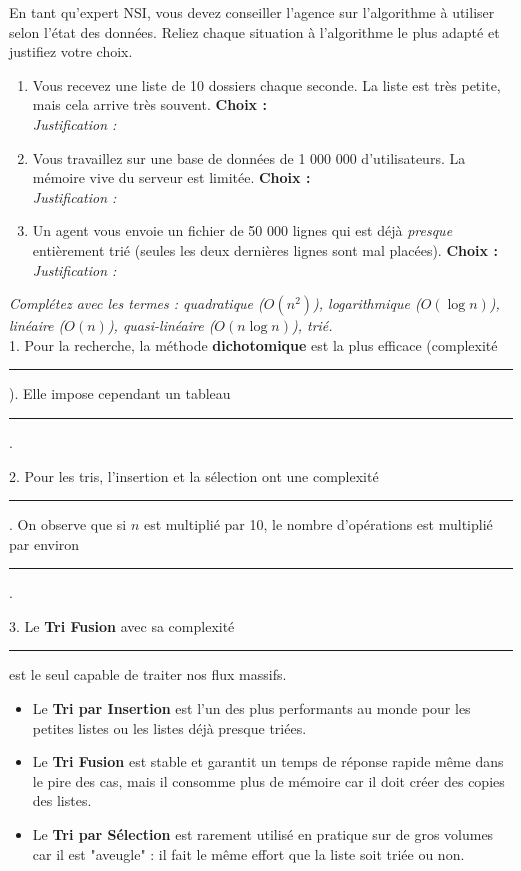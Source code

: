 \documentclass[12pt,a4paper]{report}
\begin{document}
\begin{Exercise}[title={Conclusion sur la Complexité}]

    En tant qu'expert NSI, vous devez conseiller l'agence sur l'algorithme à utiliser selon l'état des données. Reliez chaque situation à l'algorithme le plus adapté et justifiez votre choix.

    \begin{enumerate}
        \item Vous recevez une liste de 10 dossiers chaque seconde. La liste est très petite, mais cela arrive très souvent. \textbf{Choix :} \dotfill\\
        \textit{Justification :} \dotfill
        \item Vous travaillez sur une base de données de 1 000 000 d'utilisateurs. La mémoire vive du serveur est limitée. \textbf{Choix :} \dotfill\\
        \textit{Justification :} \dotfill
        \item Un agent vous envoie un fichier de 50 000 lignes qui est déjà \textit{presque} entièrement trié (seules les deux dernières lignes sont mal placées). \textbf{Choix :} \dotfill\\
        \textit{Justification :} \dotfill
    \end{enumerate}

    \textit{Complétez avec les termes : quadratique ($O(n^2)$), logarithmique ($O(\log n)$), linéaire ($O(n)$), quasi-linéaire ($O(n \log n)$), trié.}
    \\
    
    1. Pour la recherche, la méthode \textbf{dichotomique} est la plus efficace (complexité \rule[-2pt]{2.5cm}{0.4pt}). Elle impose cependant un tableau \rule[-2pt]{2.5cm}{0.4pt}.
    
    2. Pour les tris, l'insertion et la sélection ont une complexité \rule[-2pt]{2.5cm}{0.4pt}. On observe que si $n$ est multiplié par 10, le nombre d'opérations est multiplié par environ \rule[-2pt]{2.5cm}{0.4pt}.
    
    3. Le \textbf{Tri Fusion} avec sa complexité \rule[-2pt]{2.5cm}{0.4pt} est le seul capable de traiter nos flux massifs.
\end{Exercise}

\begin{Comprendre}
    \begin{itemize}
        \item Le \textbf{Tri par Insertion} est l'un des plus performants au monde pour les petites listes ou les listes déjà presque triées. 
        \item Le \textbf{Tri Fusion} est stable et garantit un temps de réponse rapide même dans le pire des cas, mais il consomme plus de mémoire car il doit créer des copies des listes.
        \item Le \textbf{Tri par Sélection} est rarement utilisé en pratique sur de gros volumes car il est "aveugle" : il fait le même effort que la liste soit triée ou non.
    \end{itemize}
\end{Comprendre}
\end{document}
